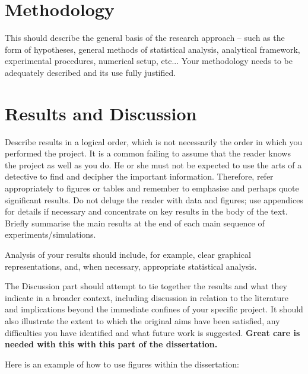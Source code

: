 \documentclass[a4paper,12pt]{article}
\begin{document}
\section{Methodology}
\label{sec:methodology}


This should describe the general basis of the research approach – such as the form of hypotheses, general methods of statistical analysis, analytical framework, experimental procedures, numerical setup, etc... Your methodology needs to be adequately described and its use fully justified.


\clearpage


\section{Results and Discussion}
\label{sec:results-discussion}

Describe results in a logical order, which is not necessarily the order in which you performed the project. It is a common failing to assume that the reader knows the project as well as you do. He or she must not be expected to use the arts of a detective to find and decipher the important information. Therefore, refer appropriately to figures or tables and remember to emphasise and perhaps quote significant results. Do not deluge the reader with data and figures; use appendices for details if necessary and concentrate on key results in the body of the text. Briefly summarise the main results at the end of each main sequence of experiments/simulations.

Analysis of your results should include, for example, clear graphical representations, and, when necessary, appropriate statistical analysis.

The Discussion part should attempt to tie together the results and what they indicate in a broader
context, including discussion in relation to the literature and implications beyond the immediate
confines of your specific project. It should also illustrate the extent to which the original aims
have been satisfied, any difficulties you have identified and what future work is suggested.
\textbf{Great care is needed with this with this part of the dissertation.} 

\clearpage

Here is an example of how to use figures within the dissertation:
\end{document}
